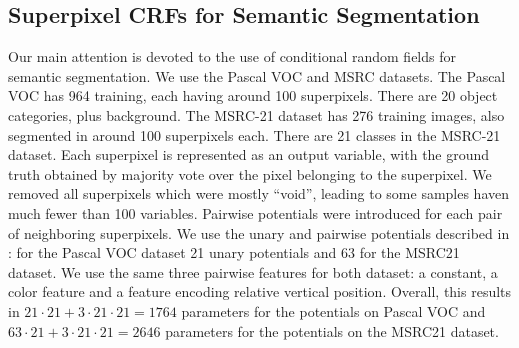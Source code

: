 \subsection{Superpixel CRFs for Semantic Segmentation}
Our main attention is devoted to the use of conditional random fields for
semantic segmentation.  We use the Pascal VOC and MSRC datasets.
The Pascal VOC has 964 training, each having
around 100 superpixels. There are 20 object categories, plus background. The %
MSRC-21 dataset has 276 training images, also segmented in around 100 superpixels
each. There are 21 classes in the MSRC-21 dataset.
Each superpixel is represented as an output variable, with the ground truth obtained
by majority vote over the pixel belonging to the superpixel. We removed all
superpixels which were mostly ``void'', leading to some samples haven much
fewer than 100 variables.
Pairwise potentials were introduced for each pair of neighboring superpixels.
We use the unary and pairwise potentials described in :
for the Pascal VOC dataset 21 unary potentials and 63 for the MSRC21 dataset.
We use the same three pairwise features for both dataset: a constant, a color
feature and a feature encoding relative vertical position.
Overall, this results in $21 \cdot  21 + 3 \cdot 21 \cdot 21 = 1764$ parameters
for the potentials on Pascal VOC and $63 \cdot  21 + 3 \cdot 21 \cdot 21 =
2646$ parameters for the potentials on the MSRC21 dataset.


